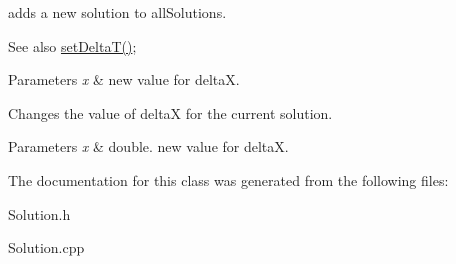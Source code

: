 adds a new solution to all\+Solutions. \begin{DoxySeeAlso}{See also}
\hyperlink{class_solution_af301d534e2214c1004837350d32569a7}{set\+Delta\+T()}; 
\end{DoxySeeAlso}

\begin{DoxyParams}{Parameters}
{\em x} & new value for deltaX.\\
\hline
\end{DoxyParams}
Changes the value of deltaX for the current solution. 
\begin{DoxyParams}{Parameters}
{\em x} & double. new value for deltaX. \\
\hline
\end{DoxyParams}


The documentation for this class was generated from the following files\+:\begin{DoxyCompactItemize}
\item 
Solution.\+h\item 
Solution.\+cpp\end{DoxyCompactItemize}
